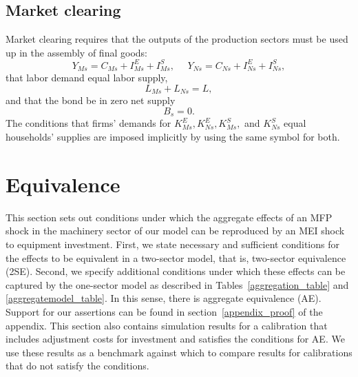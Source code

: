 \documentclass[12pt,fleqn]{article}
\begin{document}
\subsection{\protect\normalsize Market clearing}

{\normalsize Market clearing requires that the outputs of the production
sectors must be used up in the assembly of final goods:%
\begin{equation*}
Y_{Ms}=C_{Ms}+I_{Ms}^{E}+I_{Ms}^{S},\,\,\,\,\,\,\,%
\,Y_{Ns}=C_{Ns}+I_{Ns}^{E}+I_{Ns}^{S},
\end{equation*}%
that labor demand equal labor supply,
\begin{equation}
L_{Ms}+L_{Ns}=L,
\end{equation}%
and that the bond be in zero net supply%
\begin{equation}
B_s=0.
\end{equation}%
The conditions that firms' demands for $K_{Ms}^{E},K_{Ns}^{E},K_{Ms}^{S},$
and $K_{Ns}^{S}$ equal households' supplies are imposed implicitly by using
the same symbol for both.  }

\section{Equivalence}

This section sets out conditions under which the aggregate effects of an MFP
shock in the machinery sector of our model can be reproduced by an MEI shock
to equipment investment. First, we state necessary and sufficient conditions
for the effects to be equivalent in a two-sector model, that is, two-sector
equivalence (2SE). Second, we specify additional conditions under which
these effects can be captured by the one-sector model as described in Tables~\ref{aggregation_table} and \ref{aggregatemodel_table}. In this sense, there is
aggregate equivalence (AE).
Support
for our assertions can be found in section~\ref{appendix_proof} of the
appendix. This section also contains simulation results for a calibration
that includes adjustment costs for investment and satisfies the conditions
for AE. We use these results as a benchmark against which to compare results
for calibrations that do not satisfy the conditions.
\end{document}
